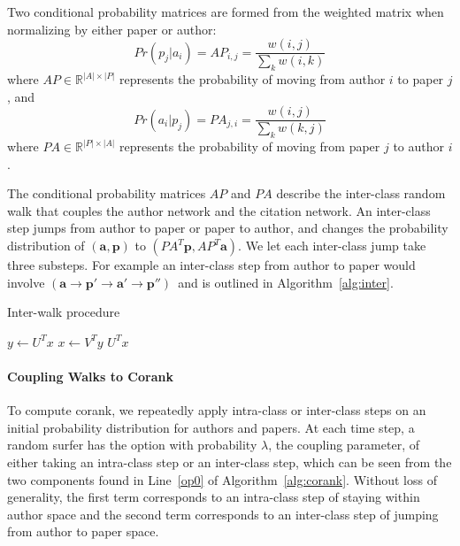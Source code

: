 Two conditional probability matrices are formed from the weighted matrix when normalizing by either paper or author:
    \begin{equation}
        Pr(p_j|a_i) = AP_{i,j} = \frac{w(i,j)}{\sum_k w(i,k)}
    \end{equation}
where $AP \in \mathbb{R}^{|A|\times|P|}$ represents the probability of moving from author $i$ to paper $j$, and
    \begin{equation}
        Pr(a_i|p_j) = PA_{j,i} = \frac{w(i,j)}{\sum_kw(k,j)}    
    \end{equation}
where $PA \in \mathbb{R}^{|P|\times|A|}$ represents the probability of moving from paper $j$ to author $i$. 

The conditional probability matrices $AP$ and $PA$ describe the inter-class random walk that couples the author network and the citation network. An inter-class step jumps from author to paper or paper to author, and changes the probability distribution of $(\mathbf{a},\mathbf{p})$ to $(PA^T\mathbf{p},AP^T\mathbf{a})$. We let each inter-class jump take three substeps. For example an inter-class step from author to paper would involve $(\mathbf{a} \rightarrow \mathbf{p'} \rightarrow \mathbf{a'} \rightarrow \mathbf{p''})$\ and is outlined in Algorithm~\ref{alg:inter}.

    \begin{algorithm}
        \caption{Inter-walk procedure}
        \begin{algorithmic}[1]
            \State $y \leftarrow U^T x$
            \State $x \leftarrow V^T y$
            \State \Return $U^T x$
        \EndFunction
        \end{algorithmic}
        \label{alg:inter}
    \end{algorithm}


\paragraph{Coupling Walks to Corank}
To compute corank, we repeatedly apply intra-class or inter-class steps on an initial probability distribution for authors and papers. At each time step, a random surfer has the option with probability $\lambda$, the coupling parameter, of either taking an intra-class step or an inter-class step, which can be seen from the two components found in Line~\ref{op0} of Algorithm~\ref{alg:corank}. Without loss of generality, the first term corresponds to an intra-class step of staying within author space and the second term corresponds to an inter-class step of jumping from author to paper space.

